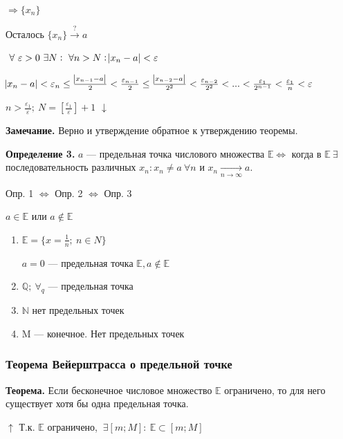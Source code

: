 \documentclass{article}
\begin{document}
  \(\Rightarrow \{x_n\}\)

  Осталось \(\{x_n\} \xrightarrow[]{\textrm{?}} a\)

  \(\ \forall\ \varepsilon > 0\ \exists N:\ \forall n > N: \abs{x_n - a} < \varepsilon\)

  \(\abs{x_n - a} < \varepsilon_n \leq \frac{\abs{x_{n-1}-a}}{2} < \frac{\varepsilon_{n-1}}{2} \leq \frac{\abs{x_{n-2}-a}}{2^2} < \frac{\varepsilon_{n-2}}{2^2} < ... < \frac{\varepsilon_{1}}{2^{n-1}} < \frac{\varepsilon_1}{n} < \varepsilon\)

  \(n > \frac{\varepsilon_1}{\varepsilon};\ N=[\frac{\varepsilon_1}{\varepsilon}] + 1\)
  \(\downarrow\)

  \textbf{Замечание.} Верно и утверждение обратное к утверждению теоремы.

  \textbf{Определение 3.} \(a\) --- предельная точка числового множества \(\mathbb{E} \Leftrightarrow\) когда в \(\mathbb{E}\ \exists\) последовательность различных \(x_n: x_n \neq a\ \forall n\) и \(x_n \xrightarrow[n \rightarrow \infty]{} a\).

  Опр. 1 \(\Leftrightarrow\) Опр. 2 \(\Leftrightarrow\) Опр. 3

  \(a \in \mathbb{E}\) или \(a \not\in \mathbb{E}\)

  \begin{enumerate}
      \item \(\mathbb{E} = \{x=\frac{1}{n};\ n \in N\}\)

      \(a = 0\) --- предельная точка \(\mathbb{E}, a \not \in \mathbb{E}\)

      \item \(\mathbb{Q};\ \forall_q\) --- предельная точка

      \item \(\mathbb{N}\) нет предельных точек

      \item M --- конечное. Нет предельных точек
  \end{enumerate}

  \subsubsection{Теорема Вейерштрасса о предельной точке}
  \textbf{Теорема.} Если бесконечное числовое множество \(\mathbb{E}\) ограничено, то для него существует хотя бы одна предельная точка.

  \(\uparrow\) Т.к. \(\mathbb{E}\) ограничено, \(\ \exists [m; M]:\ \mathbb{E} \subset  [m; M]\)
\end{document}
